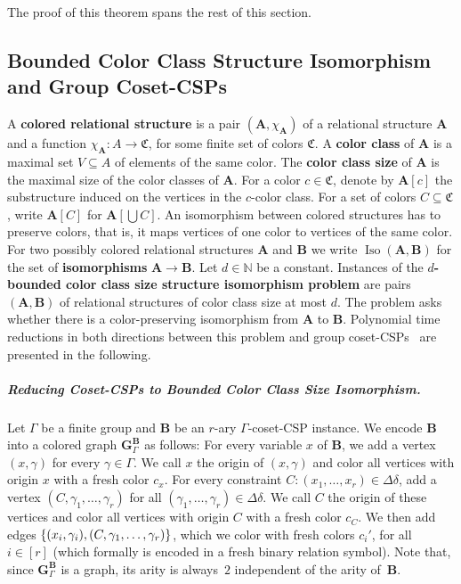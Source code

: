 \documentclass[a4paper,english, thm-restate]{lipics-v2021}
\newcommand{\defining}[1]{\textbf{#1}}
\DeclarePairedDelimiter\set{\lbrace}{\rbrace}
\newcommand{\CFIsym}{\mathbf{G}}
\newcommand{\CFIA}[2]{\CFIsym_{#1}^{#2}}
\newcommand{\StructA}{\mathbf{A}}
\newcommand{\StructB}{\mathbf{B}}
\newcommand{\bbN}{\mathbb{N}}
\newcommand{\isos}[2]{\operatorname*{Iso}(#1,#2)}
\newcommand{\colors}{\mathfrak{C}}
\begin{document}
	\noindent The proof of this theorem spans the rest of this section. 
	
	
	\subsection{Bounded Color Class Structure Isomorphism and Group Coset-CSPs}
	
	A \defining{colored relational structure} is a pair $(\StructA,\chi_\StructA)$
	of a relational structure $\StructA$ and a function $\chi_\StructA \colon A \to
	\colors$, for some finite set of colors $\colors$.
	A \defining{color class} of $\StructA$ is a maximal set $V \subseteq A$ of elements
	of the same color.
	The \defining{color class size} of $\StructA$ is the maximal size of the color classes of $\StructA$.
	For a  color $c \in \colors$, denote by $\StructA[c]$ the substructure induced
	on the vertices in the $c$-color class.
	For a set of colors $C\subseteq \colors$, write $\StructA[C]$ for $\StructA[\bigcup C]$.
	An isomorphism between colored structures has to preserve colors,
	that is, it maps vertices of one color to vertices of the same color.
	For two possibly colored relational structures $\StructA$ and $\StructB$ we write $\isos{\StructA}{\StructB}$ for the set of \defining{isomorphisms} $\StructA \to \StructB$.
	Let $d \in \bbN$ be a constant.
	Instances of the \defining{$d$-bounded color class size structure isomorphism problem} are pairs $(\StructA, \StructB)$ of relational structures
	of color class size at most $d$. The problem asks whether there is a color-preserving isomorphism from $\StructA$ to $\StructB$.
	Polynomial time reductions in both directions between this problem and group coset-CSPs~\cite{BerkholzGrohe2017} are presented in the following.
	
	\subparagraph*{Reducing Coset-CSPs to Bounded Color Class Size Isomorphism.}
	Let $\Gamma$ be a finite group and $\StructB$ be an $r$-ary $\Gamma$-coset-CSP instance.
	We encode $\StructB$ into a colored graph $\CFIA{\Gamma}{\StructB}$ as follows:
	For every variable $x$ of $\StructB$,
	we add a vertex $(x,\gamma)$ for every $\gamma \in \Gamma$.
	We call $x$ the origin of $(x,\gamma)$ and color
	all vertices with origin $x$ with a fresh color $c_x$.
	For every constraint $C\colon (x_1,\dots, x_r) \in \Delta\delta$,
	add a vertex $(C, \gamma_1,\dots, \gamma_r)$
	for all $(\gamma_1,\dots, \gamma_r) \in \Delta\delta$.
	We call $C$ the origin of these vertices and color
	all vertices with origin $C$ with a fresh color $c_C$.
	We then add edges $\set{(x_i,\gamma_i), (C, \gamma_1,\dots, \gamma_r)}$,
	which we color with fresh colors $c_i'$,
	for all $i \in [r]$ (which formally is encoded in a fresh binary relation symbol).
	Note that, since $\CFIA{\Gamma}{\StructB}$ is a graph,
	its arity is always~$2$ independent of the arity of~$\StructB$.
	
\end{document}
